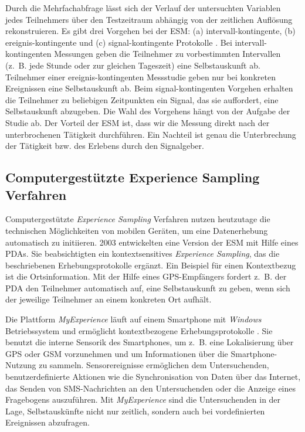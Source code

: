 Durch die Mehrfachabfrage lässt sich der Verlauf der untersuchten Variablen jedes Teilnehmers über den Testzeitraum abhängig von der zeitlichen Auflösung rekonstruieren. Es gibt drei Vorgehen bei der \ac{ESM}: (a) intervall-kontingente, (b) ereignis-kontingente und (c) signal-kontingente Protokolle \citep[vgl.][S.~198ff.]{Reis2000}. Bei intervall-kontingenten Messungen geben die Teilnehmer zu vorbestimmten Intervallen (z.~B. jede Stunde oder zur gleichen Tageszeit) eine Selbstauskunft ab. Teilnehmer einer ereignis-kontingenten Messstudie geben nur bei konkreten Ereignissen eine Selbstauskunft ab. Beim signal-kontingenten Vorgehen erhalten die Teilnehmer zu beliebigen Zeitpunkten ein Signal, das sie auffordert, eine Selbstauskunft abzugeben. Die Wahl des Vorgehens hängt von der Aufgabe der Studie ab. Der Vorteil der \ac{ESM} ist, dass wir die Messung direkt nach der unterbrochenen Tätigkeit durchführen. Ein Nachteil ist genau die Unterbrechung der Tätigkeit bzw. des Erlebens durch den Signalgeber.

\subsection{Computergestützte Experience Sampling Verfahren}

Computergestützte \emph{Experience Sampling} Verfahren nutzen heutzutage die technischen Möglichkeiten von mobilen Geräten, um eine Datenerhebung automatisch zu initiieren. 2003 entwickelten \citet{Intille2003} eine Version der \ac{ESM} mit Hilfe eines \ac{PDA}s. Sie beabsichtigten ein kontextsensitives \emph{Experience Sampling}, das die beschriebenen Erhebungsprotokolle ergänzt. Ein Beispiel für einen Kontextbezug ist die Ortsinformation. Mit der Hilfe eines \ac{GPS}-Empfängers fordert z.~B. der \ac{PDA} den Teilnehmer automatisch auf, eine Selbstauskunft zu geben, wenn sich der jeweilige Teilnehmer an einem konkreten Ort aufhält.

Die Plattform \emph{MyExperience} läuft auf einem Smartphone mit \emph{Windows} Betriebssystem und ermöglicht kontextbezogene Erhebungsprotokolle \citep[vgl.][]{Froehlich2007}. Sie benutzt die interne Sensorik des Smartphones, um z.~B. eine Lokalisierung über \ac{GPS} oder \acs{GSM} vorzunehmen und um Informationen über die Smartphone-Nutzung zu sammeln. Sensorereignisse ermöglichen dem Untersuchenden, benutzerdefinierte Aktionen wie die Synchronisation von Daten über das Internet, das Senden von \acs{SMS}-Nachrichten an den Untersuchenden oder die Anzeige eines Fragebogens auszuführen. Mit \emph{MyExperience} sind die Untersuchenden in der Lage, Selbstauskünfte nicht nur zeitlich, sondern auch bei vordefinierten Ereignissen abzufragen.

